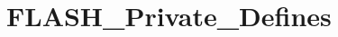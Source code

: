 \hypertarget{group___f_l_a_s_h___private___defines}{\section{F\-L\-A\-S\-H\-\_\-\-Private\-\_\-\-Defines}
\label{group___f_l_a_s_h___private___defines}
}
